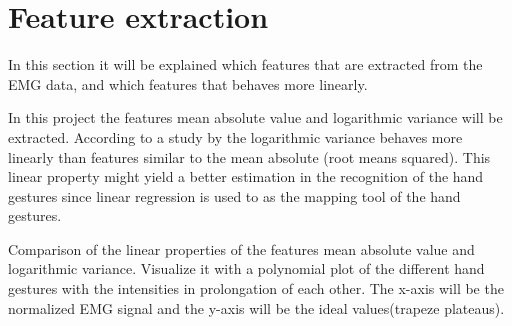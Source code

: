 \section{Feature extraction}
In this section it will be explained which features that are extracted from the EMG data, and which features that behaves more linearly. 

In this project the features mean absolute value and logarithmic variance will be extracted. According to a study by \cite{hahne2014} the logarithmic variance behaves more linearly than features similar to the mean absolute (root means squared). This linear property might yield a better estimation in the recognition of the hand gestures since linear regression is used to as the mapping tool of the hand gestures.



Comparison of the linear properties of the features mean absolute value and logarithmic variance.
Visualize it with a polynomial plot of the different hand gestures with the intensities in prolongation of each other. The x-axis will be the normalized EMG signal and the y-axis will be the ideal values(trapeze plateaus).